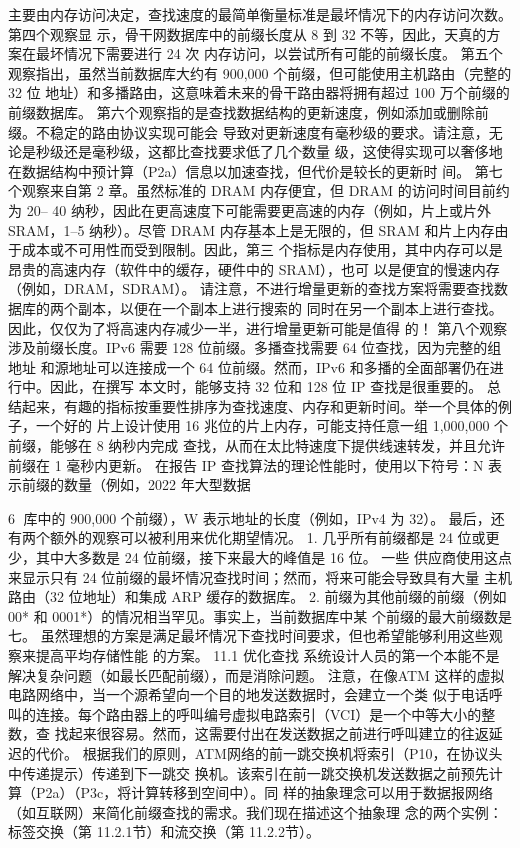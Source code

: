 主要由内存访问决定，查找速度的最简单衡量标准是最坏情况下的内存访问次数。第四个观察显
示，骨干网数据库中的前缀长度从 8 到 32 不等，因此，天真的方案在最坏情况下需要进行 24 次
内存访问，以尝试所有可能的前缀长度。
第五个观察指出，虽然当前数据库大约有 900,000 个前缀，但可能使用主机路由（完整的 32 位
地址）和多播路由，这意味着未来的骨干路由器将拥有超过 100 万个前缀的前缀数据库。
第六个观察指的是查找数据结构的更新速度，例如添加或删除前缀。不稳定的路由协议实现可能会
导致对更新速度有毫秒级的要求。请注意，无论是秒级还是毫秒级，这都比查找要求低了几个数量
级，这使得实现可以奢侈地在数据结构中预计算（P2a）信息以加速查找，但代价是较长的更新时
间。
第七个观察来自第 2 章。虽然标准的 DRAM 内存便宜，但 DRAM 的访问时间目前约为 20– 40
纳秒，因此在更高速度下可能需要更高速的内存（例如，片上或片外 SRAM，1–5 纳秒）。尽管
DRAM 内存基本上是无限的，但 SRAM 和片上内存由于成本或不可用性而受到限制。因此，第三
个指标是内存使用，其中内存可以是昂贵的高速内存（软件中的缓存，硬件中的 SRAM），也可
以是便宜的慢速内存（例如，DRAM，SDRAM）。
请注意，不进行增量更新的查找方案将需要查找数据库的两个副本，以便在一个副本上进行搜索的
同时在另一个副本上进行查找。因此，仅仅为了将高速内存减少一半，进行增量更新可能是值得
的！
第八个观察涉及前缀长度。IPv6 需要 128 位前缀。多播查找需要 64 位查找，因为完整的组地址
和源地址可以连接成一个 64 位前缀。然而，IPv6 和多播的全面部署仍在进行中。因此，在撰写
本文时，能够支持 32 位和 128 位 IP 查找是很重要的。
总结起来，有趣的指标按重要性排序为查找速度、内存和更新时间。举一个具体的例子，一个好的
片上设计使用 16 兆位的片上内存，可能支持任意一组 1,000,000 个前缀，能够在 8 纳秒内完成
查找，从而在太比特速度下提供线速转发，并且允许前缀在 1 毫秒内更新。
在报告 IP 查找算法的理论性能时，使用以下符号：N 表示前缀的数量（例如，2022 年大型数据

                                                       6
库中的 900,000 个前缀），W 表示地址的长度（例如，IPv4 为 32）。
最后，还有两个额外的观察可以被利用来优化期望情况。
  1. 几乎所有前缀都是 24 位或更少，其中大多数是 24 位前缀，接下来最大的峰值是 16 位。
    一些
    供应商使用这点来显示只有 24 位前缀的最坏情况查找时间；然而，将来可能会导致具有大量
    主机路由（32 位地址）和集成 ARP 缓存的数据库。
  2. 前缀为其他前缀的前缀（例如 00* 和 0001*）的情况相当罕见。事实上，当前数据库中某
    个前缀的最大前缀数是七。
虽然理想的方案是满足最坏情况下查找时间要求，但也希望能够利用这些观察来提高平均存储性能
的方案。
11.1 优化查找
系统设计人员的第一个本能不是解决复杂问题（如最长匹配前缀），而是消除问题。
注意，在像ATM 这样的虚拟电路网络中，当一个源希望向一个目的地发送数据时，会建立一个类
似于电话呼叫的连接。每个路由器上的呼叫编号虚拟电路索引（VCI）是一个中等大小的整数，查
找起来很容易。然而，这需要付出在发送数据之前进行呼叫建立的往返延迟的代价。
根据我们的原则，ATM网络的前一跳交换机将索引（P10，在协议头中传递提示）传递到下一跳交
换机。该索引在前一跳交换机发送数据之前预先计算（P2a）（P3c，将计算转移到空间中）。同
样的抽象理念可以用于数据报网络（如互联网）来简化前缀查找的需求。我们现在描述这个抽象理
念的两个实例：标签交换（第 11.2.1节）和流交换（第 11.2.2节）。




